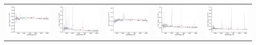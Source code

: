 \begin{center}
\begin{longtable}{l l l l l }
    \includegraphics[width=0.19\linewidth, clip]{Figs/Figs-sdss/spec-3587-55182-0140-STRIPE82-0015-024713.pdf} & \includegraphics[width=0.19\linewidth, clip]{Figs/Figs-sdss/spec-3588-55184-0604-STRIPE82-0016-029684.pdf} & \includegraphics[width=0.19\linewidth, clip]{Figs/Figs-sdss/spec-3589-55186-0260-STRIPE82-0017-024243.pdf} & \includegraphics[width=0.19\linewidth, clip]{Figs/Figs-sdss/spec-3589-55186-0374-STRIPE82-0015-013616.pdf} & \includegraphics[width=0.19\linewidth, clip]{Figs/Figs-sdss/spec-3590-55201-0554-STRIPE82-0018-038274.pdf} \\

\end{longtable}
\end{center}
